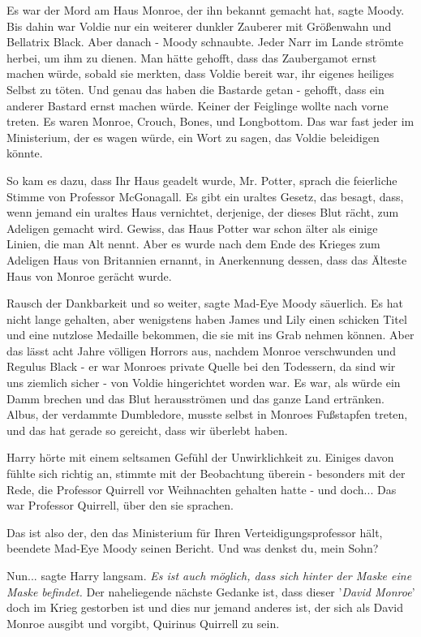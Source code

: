 \glqq Es war der Mord am Haus Monroe, der ihn bekannt gemacht hat\grqq{}, sagte
Moody. \glqq Bis dahin war Voldie nur ein weiterer dunkler Zauberer mit
Größenwahn und Bellatrix Black. Aber danach -\grqq{} Moody schnaubte. \glqq
Jeder Narr im Lande strömte herbei, um ihm zu dienen. Man hätte gehofft, dass
das Zaubergamot ernst machen würde, sobald sie merkten, dass Voldie bereit war,
ihr eigenes heiliges Selbst zu töten. Und genau das haben die Bastarde getan -
gehofft, dass ein anderer Bastard ernst machen würde. Keiner der Feiglinge
wollte nach vorne treten. Es waren Monroe, Crouch, Bones, und Longbottom. Das
war fast jeder im Ministerium, der es wagen würde, ein Wort zu sagen, das Voldie
beleidigen könnte.\grqq{}

\glqq So kam es dazu, dass Ihr Haus geadelt wurde, Mr. Potter\grqq{}, sprach die
feierliche Stimme von Professor McGonagall. \glqq Es gibt ein uraltes Gesetz,
das besagt, dass, wenn jemand ein uraltes Haus vernichtet, derjenige, der dieses
Blut rächt, zum Adeligen gemacht wird. Gewiss, das Haus Potter war schon älter
als einige Linien, die man Alt nennt. Aber es wurde nach dem Ende des Krieges
zum Adeligen Haus von Britannien ernannt, in Anerkennung dessen, dass das
Älteste Haus von Monroe gerächt wurde.\grqq{}

\glqq Rausch der Dankbarkeit und so weiter\grqq{}, sagte Mad-Eye Moody
säuerlich. \glqq Es hat nicht lange gehalten, aber wenigstens haben James und
Lily einen schicken Titel und eine nutzlose Medaille bekommen, die sie mit ins
Grab nehmen können. Aber das lässt acht Jahre völligen Horrors aus, nachdem
Monroe verschwunden und Regulus Black - er war Monroes private Quelle bei den
Todessern, da sind wir uns ziemlich sicher - von Voldie hingerichtet worden war.
Es war, als würde ein Damm brechen und das Blut herausströmen und das ganze Land
ertränken. Albus, der verdammte Dumbledore, musste selbst in Monroes Fußstapfen
treten, und das hat gerade so gereicht, dass wir überlebt haben.\grqq{}

Harry hörte mit einem seltsamen Gefühl der Unwirklichkeit zu. Einiges davon
fühlte sich richtig an, stimmte mit der Beobachtung überein - besonders mit der
Rede, die Professor Quirrell vor Weihnachten gehalten hatte - und doch... Das
war Professor Quirrell, über den sie sprachen.

\glqq Das ist also der, den das Ministerium für Ihren Verteidigungsprofessor
hält\grqq{}, beendete Mad-Eye Moody seinen Bericht. \glqq Und was denkst du,
mein Sohn?\grqq{}

\glqq Nun...\grqq{} sagte Harry langsam.
\emph{Es ist auch möglich, dass sich hinter der Maske eine Maske befindet.}
\glqq Der naheliegende nächste Gedanke ist, dass dieser '\emph{David Monroe}'
doch im Krieg gestorben ist und dies nur jemand anderes ist, der sich als David
Monroe ausgibt und vorgibt, Quirinus Quirrell zu sein.\grqq{}

